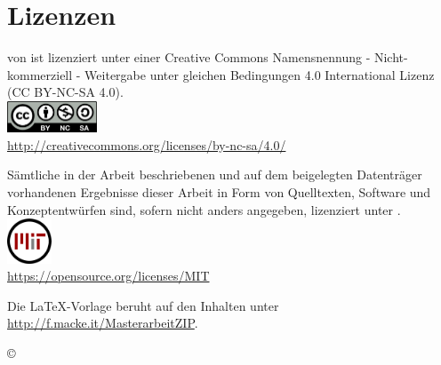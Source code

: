 \chapter*{Lizenzen}

\begin{center}

\vspace*{\fill}

\quotes{\titel} von \autor\space ist lizenziert unter einer Creative Commons Namensnennung - Nicht-kommerziell - Weitergabe unter gleichen Bedingungen 4.0 International Lizenz (CC BY-NC-SA 4.0). \\
\includegraphics[width=0.2\textwidth]{Bilder/by-nc-sa-eu}\\
\url{http://creativecommons.org/licenses/by-nc-sa/4.0/}

\bigskip\bigskip\bigskip\bigskip



Sämtliche in der Arbeit beschriebenen und auf dem beigelegten Datenträger
vorhandenen Ergebnisse dieser Arbeit in Form von Quelltexten, Software und
Konzeptentwürfen sind, sofern nicht anders angegeben, lizenziert unter . \\
\includegraphics[width=0.1\textwidth]{Bilder/mit_license}\\
\url{https://opensource.org/licenses/MIT}

\bigskip\bigskip\bigskip\bigskip

Die LaTeX-Vorlage beruht auf den Inhalten unter\\
\url{http://f.macke.it/MasterarbeitZIP}.

\bigskip\bigskip\bigskip\bigskip

{\large \copyright \space \jahr \space \autor}

\vspace*{\fill}

\end{center}
